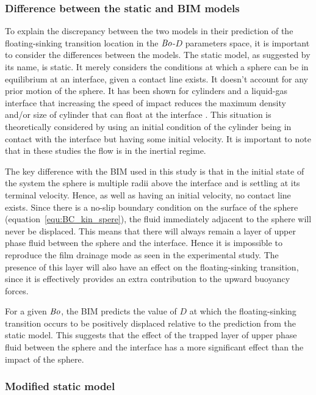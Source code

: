 \documentclass[12pt]{article}
\newcommand\Bo{\mbox{\textit{Bo}}}  %
\begin{document}
\subsubsection{Difference between the static and BIM models}
\label{subsubsec:model_diff}

To explain the discrepancy between the two models in their prediction of the floating-sinking transition location in the $\Bo$-$D$ parameters space, it is important to consider the differences between the models. The static model, as suggested by its name, is static. It merely considers the conditions at which a sphere can be in equilibrium at an interface, given a contact line exists. It doesn't account for any prior motion of the sphere. It has been shown for cylinders and a liquid-gas interface that increasing the speed of impact reduces the maximum density and/or size of cylinder that can float at the interface \citet{Vella07, Vella10}. This situation is theoretically considered by using an initial condition of the cylinder being in contact with the interface but having some initial velocity. It is important to note that in these studies the flow is in the inertial regime.

The key difference with the BIM used in this study is that in the initial state of the system the sphere is multiple radii above the interface and is settling at its terminal velocity. Hence, as well as having an initial velocity, no contact line exists. Since there is a no-slip boundary condition on the surface of the sphere (equation~\ref{equ:BC_kin_spere}), the fluid immediately adjacent to the sphere will never be displaced. This means that there will always remain a layer of upper phase fluid between the sphere and the interface. Hence it is impossible to reproduce the film drainage mode as seen in the experimental study. The presence of this layer will also have an effect on the floating-sinking transition, since it is effectively provides an extra contribution to the upward buoyancy forces. 

For a given $\Bo$, the BIM predicts the value of $D$ at which the floating-sinking transition occurs to be positively displaced relative to the prediction from the static model. This suggests that the effect of the trapped layer of upper phase fluid between the sphere and the interface has a more significant effect than the impact of the sphere.

\subsubsection{Modified static model}
\label{subsubsec:mod_stat_mod}
\end{document}
